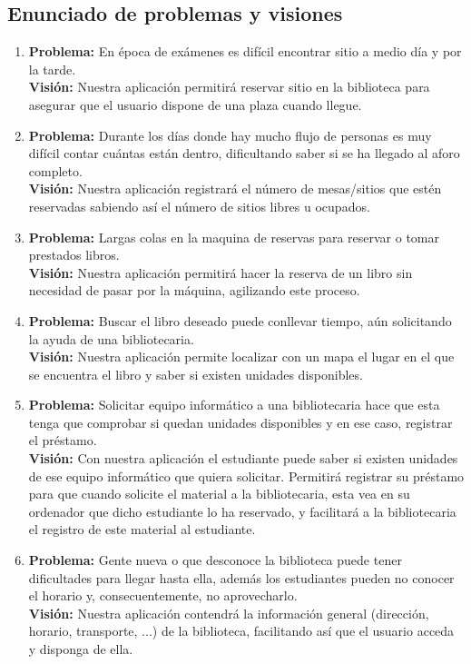 \documentclass[12pt]{article}
\begin{document}
\subsection{Enunciado de problemas y visiones}
\begin{enumerate}

\item \textbf{Problema:} En época de exámenes es difícil encontrar sitio a medio día y por la tarde. \\
\textbf{Visión:} Nuestra aplicación permitirá reservar sitio en la biblioteca para asegurar que el usuario dispone de una plaza cuando llegue.

\item \textbf{Problema:} Durante los días donde hay mucho flujo de personas es muy difícil contar cuántas están dentro, dificultando saber si se ha llegado al aforo completo. \\
\textbf{Visión:} Nuestra aplicación registrará el número de mesas/sitios que estén reservadas sabiendo así el número de sitios libres u ocupados.

\item \textbf{Problema:} Largas colas en la maquina de reservas para reservar o tomar prestados libros. \\
\textbf{Visión:} Nuestra aplicación permitirá hacer la reserva de un libro sin necesidad de pasar por la máquina, agilizando este proceso.

\item \textbf{Problema:} Buscar el libro deseado puede conllevar tiempo, aún solicitando la ayuda de una bibliotecaria. \\
\textbf{Visión:} Nuestra aplicación permite localizar con un mapa el lugar en el que se encuentra el libro y saber si existen unidades disponibles.

\item \textbf{Problema:} Solicitar equipo informático a una bibliotecaria hace que esta tenga que comprobar si quedan unidades disponibles y en ese caso, registrar el préstamo. \\
\textbf{Visión:} Con nuestra aplicación el estudiante puede saber si existen unidades de ese equipo informático que quiera solicitar. Permitirá registrar su préstamo para que cuando solicite el material a la bibliotecaria, esta vea en su ordenador que dicho estudiante lo ha reservado, y facilitará a la bibliotecaria el registro de este material al estudiante.

\item \textbf{Problema:} Gente nueva o que desconoce la biblioteca puede tener dificultades para llegar hasta ella, además los estudiantes pueden no conocer el horario y, consecuentemente, no aprovecharlo. \\
\textbf{Visión:} Nuestra aplicación contendrá la información general (dirección, horario, transporte, ...) de la biblioteca, facilitando así que el usuario acceda y disponga de ella.

\end{enumerate}
\end{document}
